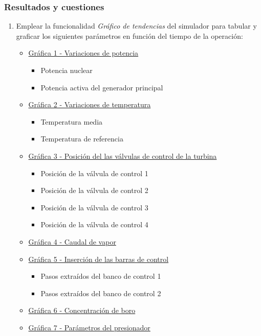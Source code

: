 \subsubsection{Resultados y cuestiones}

\begin{enumerate}
  \item Emplear la funcionalidad \textit{Gráfico de tendencias} del simulador para tabular y graficar los siguientes parámetros en función del tiempo de la operación:
    \begin{itemize}
      \item \underline{Gráfica 1 - Variaciones de potencia}
      \begin{itemize}
        \item Potencia nuclear
        \item Potencia activa del generador principal
      \end{itemize}
      \item \underline{Gráfica 2 - Variaciones de temperatura}
      \begin{itemize}
        \item Temperatura media
        \item Temperatura de referencia
      \end{itemize}
      \item \underline{Gráfica 3 - Posición del las válvulas de control de la turbina}
      \begin{itemize}
        \item Posición de la válvula de control 1
        \item Posición de la válvula de control 2
        \item Posición de la válvula de control 3
        \item Posición de la válvula de control 4
      \end{itemize}
      \item \underline{Gráfica 4 - Caudal de vapor}
      \item \underline{Gráfica 5 - Inserción de las barras de control}
      \begin{itemize}
        \item Pasos extraídos del banco de control 1
        \item Pasos extraídos del banco de control 2
      \end{itemize}
      \item \underline{Gráfica 6 - Concentración de boro}
      \item \underline{Gráfica 7 - Parámetros del presionador}

\end{itemize}
\end{enumerate}
